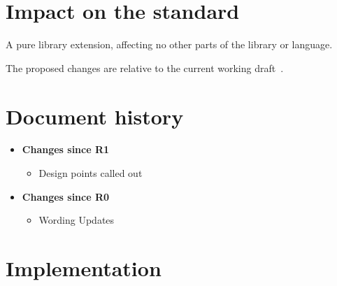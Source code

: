 \documentclass[a4paper,10pt,oneside,openany,final,article]{memoir}
\begin{document}
\chapter{Impact on the standard}

A pure library extension, affecting no other parts of the library or language.

The proposed changes are relative to the current working draft~\cite{N4910}.

\chapter*{Document history}

\begin{itemize}
\item \textbf{Changes since R1}
  \begin{itemize}
  \item Design points called out
  \end{itemize}
\item \textbf{Changes since R0}
  \begin{itemize}
  \item Wording Updates
  \end{itemize}
\end{itemize}

\renewcommand{\bibname}{References}



\backmatter
\chapter*{Implementation}
\end{document}
